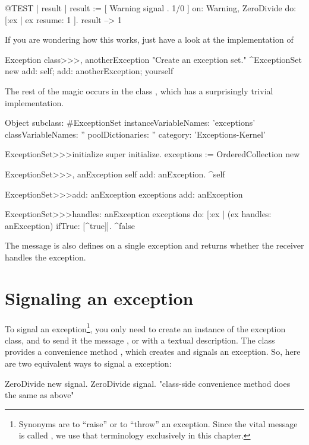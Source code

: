 \documentclass[a4paper,10pt,twoside]{book}
\begin{document}
\begin{code}{@TEST | result |}
result := [ Warning signal . 1/0 ]
	on: Warning, ZeroDivide
	do: [:ex | ex resume: 1 ].
result --> 1
\end{code}

If you are wondering how this works, just have a look at the implementation of 

\begin{code}{}
Exception class>>>, anotherException
	"Create an exception set."
	^ExceptionSet new add: self; add: anotherException; yourself
\end{code}

The rest of the magic occurs in the class , which has a surprisingly trivial implementation.

\begin{code}{}
Object subclass: #ExceptionSet
	instanceVariableNames: 'exceptions'
	classVariableNames: ''
	poolDictionaries: ''
	category: 'Exceptions-Kernel'

ExceptionSet>>>initialize
	super initialize.
	exceptions := OrderedCollection new

ExceptionSet>>>, anException
	self add: anException.
	^self

ExceptionSet>>>add: anException
	exceptions add: anException

ExceptionSet>>>handles: anException
	exceptions do: [:ex | (ex handles: anException) ifTrue: [^true]].
	^false
\end{code}

The message  is also defines on a single exception and returns whether the receiver handles the exception.





\section{Signaling an exception}

To signal an exception\footnote{Synonyms are to ``raise'' or to ``throw'' an exception. Since the vital message is called , we use that terminology exclusively in this chapter.}, you only need to create an instance of the exception class, and to send it the message , or  with a textual description. The class  provides a convenience method , which creates and signals an exception. So, here are two equivalent ways to signal a  exception:
\begin{code}{}
	ZeroDivide new signal.
	ZeroDivide signal.    "class-side convenience method does the same as above"
\end{code}
\end{document}
